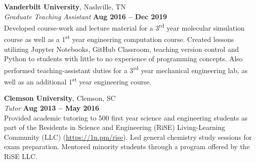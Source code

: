 \textbf{Vanderbilt University}, Nashville, TN \vspace{2mm}\\\vspace{1mm}%
\textsl{Graduate Teaching Assistant} \hfill \textbf{Aug 2016 -- Dec 2019}\\
Developed course-work and lecture material for a 3\textsuperscript{rd} year molecular simulation course as well as a 1\textsuperscript{st} year engineering computation course.
Created lessons utilizing Jupyter Notebooks, GitHub Classroom, teaching version control and Python to students with little to no experience of programming concepts.
Also performed teaching-assistant duties for a 3\textsuperscript{rd} year mechanical engineering lab, as well as an additional 1\textsuperscript{st} year engineering course.

\textbf{Clemson University}, Clemson, SC \vspace{2mm}\\\vspace{1mm}%
\textsl{Tutor} \hfill \textbf{Aug 2013 -- May 2016}\\
Provided academic tutoring to 500 first year science and engineering students as part of the Residents in Science and Engineering (RiSE) Living-Learning Community (LLC) (\url{https://1n.pm/rise}).
Led general chemistry study sessions for exam preparation.
Mentored minority students through a program offered by the RiSE LLC.